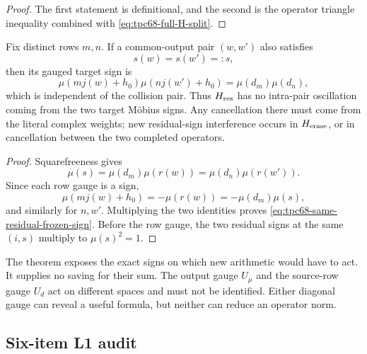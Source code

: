 \begin{proof}
The first statement is definitional, and the second is the operator
triangle inequality combined with
\eqref{eq:tpc68-full-H-split}.
\end{proof}

\begin{proposition}
\label{prop:tpc68-same-residual-sign-freeze}
Fix distinct rows \(m,n\).  If a common-output pair
\((w,w')\) also satisfies
\[
 s(w)=s(w')=:s,
\]
then its gauged target sign is
\begin{equation}
 \boxed{
 \mu(mj(w)+h_0)\mu(nj(w')+h_0)
 =\mu(d_m)\mu(d_n),}
 \label{eq:tpc68-same-residual-frozen-sign}
\end{equation}
which is independent of the collision pair.  Thus \(H_{\rm res}\) has no
intra-pair oscillation coming from the two target M\"obius signs.  Any
cancellation there must come from the literal complex weights; new
residual-sign interference occurs in \(H_{\rm erase}\), or in cancellation
between the two completed operators.
\end{proposition}

\begin{proof}
Squarefreeness gives
\[
 \mu(s)=\mu(d_m)\mu(r(w))
       =\mu(d_n)\mu(r(w')).
\]
Since each row gauge is a sign,
\[
 \mu(mj(w)+h_0)
 =-\mu(r(w))
 =-\mu(d_m)\mu(s),
\]
and similarly for \(n,w'\).  Multiplying the two identities proves
\eqref{eq:tpc68-same-residual-frozen-sign}.  Before the row gauge, the two
residual signs at the same \((i,s)\) multiply to \(\mu(s)^2=1\).
\end{proof}

\begin{remark}
\label{rem:tpc68-gauge-not-cancellation}
The theorem exposes the exact signs on which new arithmetic would have to
act.  It supplies no saving for their sum.  The output gauge \(U_\mu\) and
the source-row gauge \(U_d\) act on different spaces and must not be
identified.  Either diagonal gauge can reveal a useful formula, but
neither can reduce an operator norm.
\end{remark}

\subsection{Six-item L1 audit}

